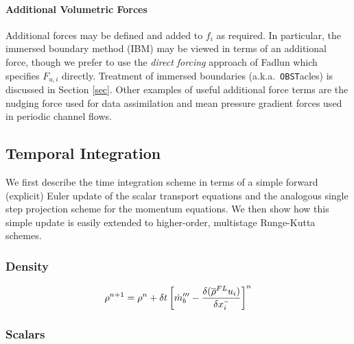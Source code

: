 \documentclass[11pt]{article}
\begin{document}
\paragraph{Additional Volumetric Forces} Additional forces may be defined and added to $f_i$ as required.  In particular, the immersed boundary method (IBM) may be viewed in terms of an additional force, though we prefer to use the \emph{direct forcing} approach of Fadlun \cite{Fadlun} which specifies $F_{u,i}$ directly. Treatment of immersed boundaries (a.k.a.~{\tt OBST}acles) is discussed in Section \ref{sec}.  Other examples of useful additional force terms are the nudging force used for data assimilation and mean pressure gradient forces used in periodic channel flows.






\subsection{Temporal Integration}

We first describe the time integration scheme in terms of a simple forward (explicit) Euler update of the scalar transport equations and the analogous single step projection scheme for the momentum equations.  We then show how this simple update is easily extended to higher-order, multistage Runge-Kutta schemes.

\subsubsection{Density}

\begin{equation}
\label{eqn_densityupdate}
\rho^{n+1} = \rho^n + \delta t \left[\dot{m}_b^{\prime\prime\prime} - \frac{\delta (\overline{\rho}^{FL} u_i)}{\delta x_i^{\scriptscriptstyle -}} \right]^n
\end{equation}

\subsubsection{Scalars}
\end{document}
